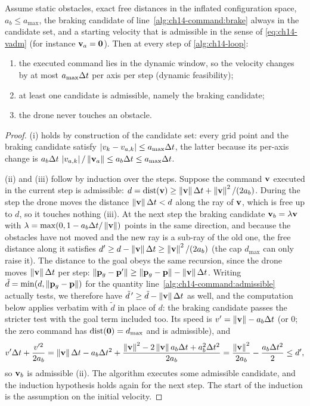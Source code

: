 \begin{theorem}
\label{thm:ch14-safety}
Assume static obstacles, exact free distances in the inflated configuration
space, $a_b \le a_{\max}$, the braking candidate of
line~\ref{alg:ch14-command:brake} always in the candidate set, and a starting
velocity that is admissible in the sense of \cref{eq:ch14-vadm} (for
instance $\mathbf{v}_a = \mathbf{0}$). Then at every step of \cref{alg:ch14-loop}:
\begin{enumerate}[label=(\roman*)]
  \item the executed command lies in the dynamic window, so the velocity
        changes by at most $a_{\max}\Delta t$ per axis per step (dynamic feasibility);
  \item at least one candidate is admissible, namely the braking candidate;
  \item the drone never touches an obstacle.
\end{enumerate}
\end{theorem}
\begin{proof}
(i) holds by construction of the candidate set: every grid point and the
braking candidate satisfy $\left\lvert v_k - v_{a,k} \right\rvert \le a_{\max}\Delta t$, the latter
because its per-axis change is $a_b\Delta t\,\left\lvert v_{a,k} \right\rvert/\left\lVert \mathbf{v}_a \right\rVert \le
a_b\Delta t \le a_{\max}\Delta t$.

(ii) and (iii) follow by induction over the steps. Suppose the command $\mathbf{v}$
executed in the current step is admissible: $d = \operatorname{dist}(\mathbf{v}) \ge
\left\lVert \mathbf{v} \right\rVert\Delta t + \left\lVert \mathbf{v} \right\rVert^2/(2a_b)$. During the step the drone moves the
distance $\left\lVert \mathbf{v} \right\rVert\Delta t < d$ along the ray of $\mathbf{v}$, which is free up to
$d$, so it touches nothing (iii). At the next step the braking candidate
$\mathbf{v}_b = \lambda\mathbf{v}$ with $\lambda = \max(0, 1 - a_b\Delta t/\left\lVert \mathbf{v} \right\rVert)$
points in the same direction, and because the obstacles have not moved and
the new ray is a sub-ray of the old one, the free distance along it satisfies
$d' \ge d - \left\lVert \mathbf{v} \right\rVert\Delta t \ge \left\lVert \mathbf{v} \right\rVert^2/(2a_b)$ (the cap $d_{\max}$ can
only raise it). The distance to the goal obeys the same recursion, since the
drone moves $\left\lVert \mathbf{v} \right\rVert\Delta t$ per step: $\left\lVert \mathbf{p}_g - \mathbf{p}' \right\rVert \ge
\left\lVert \mathbf{p}_g - \mathbf{p} \right\rVert - \left\lVert \mathbf{v} \right\rVert\Delta t$. Writing $\tilde d = \min(d,
\left\lVert \mathbf{p}_g - \mathbf{p} \right\rVert)$ for the quantity line~\ref{alg:ch14-command:admissible}
actually tests, we therefore have $\tilde d\,' \ge \tilde d - \left\lVert \mathbf{v} \right\rVert\Delta t$
as well, and the computation below applies verbatim with $\tilde d$ in place
of $d$: the braking candidate passes the stricter test with the goal term
included too. Its speed is $v' = \left\lVert \mathbf{v} \right\rVert - a_b\Delta t$ (or $0$; the zero
command has $\operatorname{dist}(\mathbf{0}) = d_{\max}$ and is admissible), and
\[
  v'\Delta t + \frac{v'^2}{2a_b}
  = \left\lVert \mathbf{v} \right\rVert\Delta t - a_b\Delta t^2 + \frac{\left\lVert \mathbf{v} \right\rVert^2 - 2\left\lVert \mathbf{v} \right\rVert a_b\Delta t + a_b^2\Delta t^2}{2a_b}
  = \frac{\left\lVert \mathbf{v} \right\rVert^2}{2a_b} - \frac{a_b\Delta t^2}{2} \le d',
\]
so $\mathbf{v}_b$ is admissible (ii). The algorithm executes some admissible
candidate, and the induction hypothesis holds again for the next step. The
start of the induction is the assumption on the initial velocity.
\end{proof}

